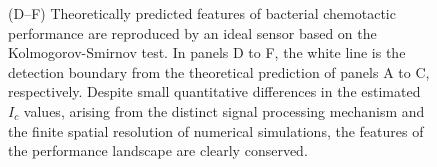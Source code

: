 \documentclass[9pt,twocolumn,twoside]{pnas-new}
\begin{document}
\begin{figure}
{        %
        (D--F) Theoretically predicted features of bacterial chemotactic performance are reproduced by an ideal sensor based on the Kolmogorov-Smirnov test.
        In panels D to F, the white line is the detection boundary from the theoretical prediction of panels A to C, respectively.
        Despite small quantitative differences in the estimated $I_c$ values, arising from the distinct signal processing mechanism and the finite spatial resolution of numerical simulations,
        the features of the performance landscape are clearly conserved.
    }
    \label{fig:strategies}
\end{figure}
\end{document}
